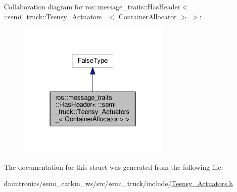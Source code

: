 Collaboration diagram for ros\+:\+:message\+\_\+traits\+:\+:Has\+Header$<$ \+:\+:semi\+\_\+truck\+:\+:Teensy\+\_\+\+Actuators\+\_\+$<$ Container\+Allocator $>$ $>$\+:\nopagebreak
\begin{figure}[H]
\begin{center}
\leavevmode
\includegraphics[width=209pt]{structros_1_1message__traits_1_1_has_header_3_01_1_1semi__truck_1_1_teensy___actuators___3_01_cobb41f2262ef52d212439be3a2bb589cf}
\end{center}
\end{figure}


The documentation for this struct was generated from the following file\+:\begin{DoxyCompactItemize}
\item 
daimtronics/semi\+\_\+catkin\+\_\+ws/src/semi\+\_\+truck/include/\hyperlink{_teensy___actuators_8h}{Teensy\+\_\+\+Actuators.\+h}\end{DoxyCompactItemize}
